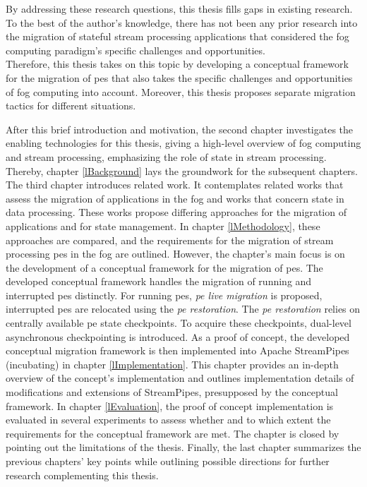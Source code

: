 By addressing these research questions, this thesis fills gaps in existing research. To the best of the author's knowledge, there has not been any prior research into the migration of stateful stream processing applications that considered the fog computing paradigm's specific challenges and opportunities.\\
Therefore, this thesis takes on this topic by developing a conceptual framework for the migration of \gls{pe}s that also takes the specific challenges and opportunities of fog computing into account. Moreover, this thesis proposes separate migration tactics for different situations.\par

After this brief introduction and motivation, the second chapter investigates the enabling technologies for this thesis, giving a high-level overview of fog computing and stream processing, emphasizing the role of state in stream processing. Thereby, chapter \ref{lBackground} lays the groundwork for the subsequent chapters. The third chapter introduces related work. It contemplates related works that assess the migration of applications in the fog and works that concern state in data processing. These works propose differing approaches for the migration of applications and for state management. In chapter \ref{lMethodology}, these approaches are compared, and the requirements for the migration of stream processing \gls{pe}s in the fog are outlined. However, the chapter's main focus is on the development of a conceptual framework for the migration of \gls{pe}s. The developed conceptual framework handles the migration of running and interrupted \gls{pe}s distinctly. For running \gls{pe}s, \textit{\acrshort{pe} live migration} is proposed, interrupted \gls{pe}s are relocated using the \textit{\acrshort{pe} restoration}. The \textit{\acrshort{pe} restoration} relies on centrally available \gls{pe} state checkpoints. To acquire these checkpoints, dual-level asynchronous checkpointing is introduced. As a proof of concept, the developed conceptual migration framework is then implemented into Apache StreamPipes (incubating) in chapter \ref{lImplementation}. This chapter provides an in-depth overview of the concept's implementation and outlines implementation details of modifications and extensions of StreamPipes, presupposed by the conceptual framework. In chapter \ref{lEvaluation}, the proof of concept implementation is evaluated in several experiments to assess whether and to which extent the requirements for the conceptual framework are met. The chapter is closed by pointing out the limitations of the thesis. Finally, the last chapter summarizes the previous chapters' key points while outlining possible directions for further research complementing this thesis.